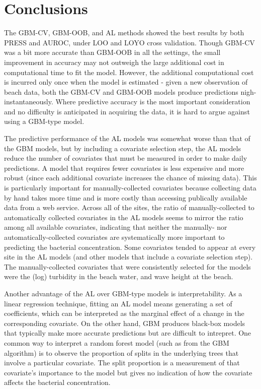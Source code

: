 \documentclass[authoryear,review, 12pt]{elsarticle}
\begin{document}
\section{Conclusions}\label{discussion}

The GBM-CV, GBM-OOB, and AL methods showed the best results by both
PRESS and AUROC, under LOO and LOYO cross validation. Though GBM-CV was
a bit more accurate than GBM-OOB in all the settings, the small
improvement in accuracy may not outweigh the large additional cost in
computational time to fit the model. However, the additional
computational cost is incurred only once when the model is estimated -
given a new observation of beach data, both the GBM-CV and GBM-OOB
models produce predictions nigh-instantaneously. Where predictive
accuracy is the most important consideration and no difficulty is
anticipated in acquiring the data, it is hard to argue against using a
GBM-type model.

The predictive performance of the AL models was somewhat worse than that
of the GBM models, but by including a covariate selection step, the AL
models reduce the number of covariates that must be measured in order to
make daily predictions. A model that requires fewer covariates is less
expensive and more robust (since each additional covariate increases the chance of missing data). This is
particularly important for manually-collected covariates because
collecting data by hand takes more time and is more costly than
accessing publically available data from a web service. Across all of
the sites, the ratio of manually-collected to automatically collected
covariates in the AL models seems to mirror the ratio among all
available covariates, indicating that neither the manually- nor
automatically-collected covariates are systematically more important to
predicting the bacterial concentration. Some covariates tended to appear
at every site in the AL models (and other models that include a
covariate selection step). The manually-collected covariates that were
consistently selected for the models were the (log) turbidity in the
beach water, and wave height at the beach.

Another advantage of the AL over GBM-type models is interpretability. As
a linear regression technique, fitting an AL model means generating a
set of coefficients, which can be interpreted as the marginal effect of
a change in the corresponding covariate. On the other hand, GBM produces
black-box models that typically make more accurate predictions but are
difficult to intrepret. One common way to interpret a random forest
model (such as from the GBM algorithm) is to observe the proportion of
splits in the underlying trees that involve a particular covariate. The
split proportion is a measurement of that covariate's importance to the
model but gives no indication of how the covariate affects the
bacterial concentration.
\end{document}
